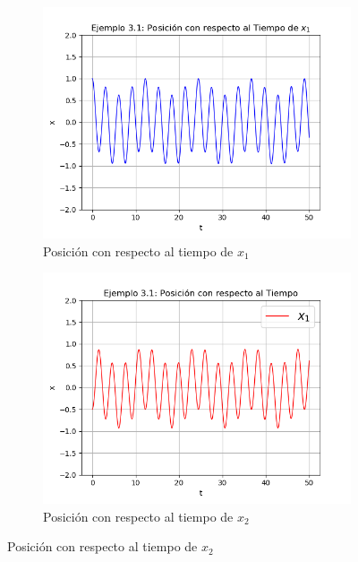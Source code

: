 \documentclass[a4paper]{article}
\begin{document}
\begin{center}
\begin{figure}[ht!]
\begin{subfigure}{0.6\textwidth}
  \centering
  \includegraphics[width=\linewidth]{ejemplo_3_1_2.png}
  \caption{Posición con respecto al tiempo de $x_1$}
\end{subfigure}
\begin{subfigure}{0.6\textwidth}
  \centering
  \includegraphics[width=\linewidth]{ejemplo_3_1_3.png}
  \caption{Posición con respecto al tiempo de $x_2$}
\end{subfigure}
\end{figure}
\begin{figure}[ht!]
\begin{subfigure}{0.6\textwidth}
  \centering

\end{subfigure}
\end{figure}
\end{center}
\end{document}
